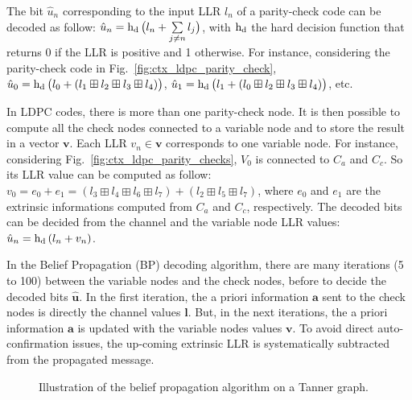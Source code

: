 The bit $\hat{u}_n$ corresponding to the input LLR $l_n$ of a parity-check code
can be decoded as follow: $\hat{u}_n = \operatorname{h_d}\big(l_n +
\sum\limits_{j \neq n}{l_j}\big)$, with $\operatorname{h_d}$ the hard decision function
that returns 0 if the LLR is positive and 1 otherwise. For instance, considering
the parity-check code in Fig.~\ref{fig:ctx_ldpc_parity_check}, $\hat{u}_0 =
\operatorname{h_d}\big(l_0 + (l_1 \boxplus l_2 \boxplus l_3 \boxplus l_4)\big)$,
$\hat{u}_1 = \operatorname{h_d}\big(l_1 + (l_0 \boxplus l_2 \boxplus l_3 \boxplus
l_4)\big)$, etc.

In LDPC codes, there is more than one parity-check node. It is then possible to
compute all the check nodes connected to a variable node and to store the result
in a vector $\bm{v}$. Each LLR $v_n \in \bm{v}$ corresponds to one variable
node. For instance, considering Fig.~\ref{fig:ctx_ldpc_parity_checks}, $V_0$ is
connected to $C_a$ and $C_c$. So its LLR value can be computed as follow: $v_0
= e_0 + e_1 = (l_3 \boxplus l_4 \boxplus l_6 \boxplus l_7) + (l_2 \boxplus l_5
\boxplus l_7)$, where $e_0$ and $e_1$ are the extrinsic informations computed
from $C_a$ and $C_c$, respectively. The decoded bits can be decided from the
channel and the variable node LLR values: $\hat{u}_n = \operatorname{h_d}{(l_n + v_n)}$.

In the Belief Propagation (BP) decoding algorithm, there are many iterations (5
to 100) between the variable nodes and the check nodes, before to decide the
decoded bits $\bm{\hat{u}}$. In the first iteration, the a priori information
$\bm{a}$ sent to the check nodes is directly the channel values $\bm{l}$. But,
in the next iterations, the a priori information $\bm{a}$ is updated with the
variable nodes values $\bm{v}$. To avoid direct auto-confirmation issues, the
up-coming extrinsic LLR is systematically subtracted from the propagated
message.

\begin{figure}[htp]
  \centering
  \quad
  \caption{Illustration of the belief propagation algorithm on a Tanner graph.}
  \label{fig:ctx_ldpc_bp}
\end{figure}

